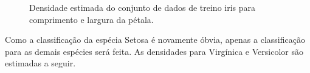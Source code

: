 \documentclass[
  a4paperpaper,
]{article}
\begin{document}
\begin{figure}[H]


\caption{\label{fig-kdeiris}Densidade estimada do conjunto de dados de
treino iris para comprimento e largura da pétala.}

\end{figure}%

Como a classificação da espécia Setosa é novamente óbvia, apenas a
classificação para as demais espécies será feita. As densidades para
Virgínica e Versicolor são estimadas a seguir.

~
\end{document}
